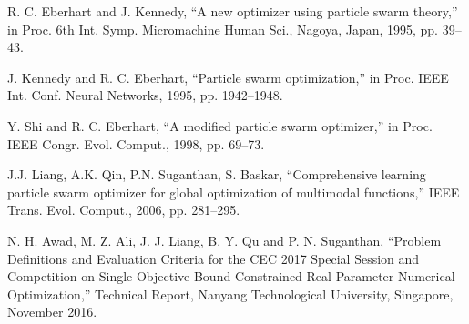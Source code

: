 \documentclass[letterpaper,12pt]{article}
\begin{document}
\newpage
\begin{thebibliography}{99}
R. C. Eberhart and J. Kennedy, “A new optimizer using particle swarm theory,” in Proc. 6th Int. Symp. Micromachine Human Sci., Nagoya, Japan, 1995, pp. 39–43.

J. Kennedy and R. C. Eberhart, “Particle swarm optimization,” in Proc. IEEE Int. Conf. Neural Networks, 1995, pp. 1942–1948.

Y. Shi and R. C. Eberhart, “A modified particle swarm optimizer,” in Proc. IEEE Congr. Evol. Comput., 1998, pp. 69–73.

J.J. Liang, A.K. Qin, P.N. Suganthan, S. Baskar, “Comprehensive learning particle swarm optimizer for global optimization of multimodal functions,” IEEE Trans. Evol. Comput., 2006, pp. 281–295.

N. H. Awad, M. Z. Ali, J. J. Liang, B. Y. Qu and P. N. Suganthan, “Problem Definitions and Evaluation Criteria for the CEC 2017 Special Session and Competition on Single Objective Bound Constrained Real-Parameter Numerical Optimization,”  Technical Report, Nanyang Technological University, Singapore, November 2016.

\end{thebibliography}
\end{document}
